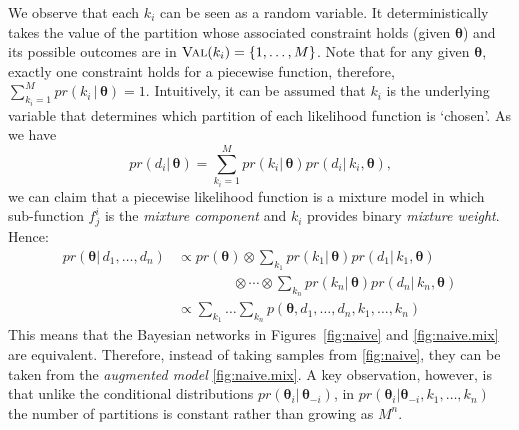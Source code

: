 We observe that each $k_i$ can be seen as a random variable. 
It deterministically takes the value of the partition whose associated constraint holds (given $\boldsymbol\theta$) and its possible outcomes are in $\textsc{Val}(k_i) = \{1, \ldots, M\}$. 
Note that for any given $\boldsymbol\theta$, exactly one constraint holds for a piecewise function, therefore, 
$\sum_{k_i = 1}^M pr(k_i \,|\, \boldsymbol\theta) = 1$.
Intuitively, it can be assumed that $k_i$ is the underlying variable that determines which partition of each likelihood function is `chosen'. As we have 
\begin{equation}
\label{e:aaaax}
pr(d_i | \, \boldsymbol\theta) = \sum_{k_i = 1}^M pr(k_i | \, \boldsymbol\theta) pr(d_i | \, k_i, \boldsymbol\theta) \text{,}
\end{equation}
we can claim that a piecewise likelihood function is a mixture model in which sub-function $f^i_j$ is the \emph{mixture component} and 
 $k_i$ provides binary \emph{mixture weight}. Hence:
{\small
\begin{align*}
pr(\boldsymbol\theta | \, d_1, \ldots, d_n) 
&\propto
pr(\boldsymbol\theta) \otimes
\sum_{k_1}pr(k_1 | \, \boldsymbol\theta) pr(d_1 | \, k_1, \boldsymbol\theta) \\
&\qquad\qquad \otimes
\cdots \otimes
\sum_{k_n}pr(k_n | \, \boldsymbol\theta) pr(d_n | \, k_n, \boldsymbol\theta)
\\
&\propto
\sum_{k_1} \ldots \sum_{k_n} p(\boldsymbol\theta, d_1, \ldots, d_n, k_1, \ldots, k_n) 
\end{align*}}
This means that the Bayesian networks in Figures~\ref{fig:naive} and \ref{fig:naive.mix} are equivalent.
Therefore, instead of taking samples from \ref{fig:naive}, 
they can be taken from the \emph{augmented model} \ref{fig:naive.mix}. A key observation, however, is that 
unlike the conditional distributions $pr(\boldsymbol\theta_i | \, \boldsymbol\theta_{-i})$, 
in $pr(\boldsymbol\theta_i | \boldsymbol\theta_{-i}, k_1, \ldots, k_n)$ 
the number of partitions is constant rather than growing as $M^n$.
%

